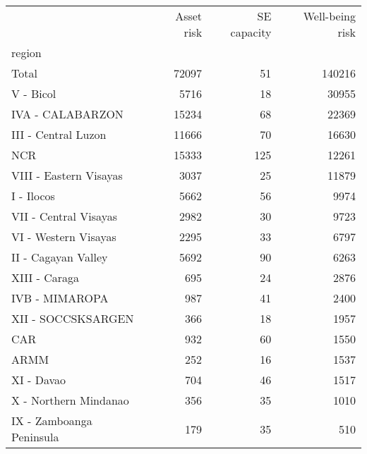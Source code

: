 \begin{tabular}{lrrr}
\toprule
{} &  Asset risk &  SE capacity &  Well-being risk \\
region                   &             &              &                  \\
\midrule
Total                    &       72097 &           51 &           140216 \\
V - Bicol                &        5716 &           18 &            30955 \\
IVA - CALABARZON         &       15234 &           68 &            22369 \\
III - Central Luzon      &       11666 &           70 &            16630 \\
NCR                      &       15333 &          125 &            12261 \\
VIII - Eastern Visayas   &        3037 &           25 &            11879 \\
I - Ilocos               &        5662 &           56 &             9974 \\
VII - Central Visayas    &        2982 &           30 &             9723 \\
VI - Western Visayas     &        2295 &           33 &             6797 \\
II - Cagayan Valley      &        5692 &           90 &             6263 \\
XIII - Caraga            &         695 &           24 &             2876 \\
IVB - MIMAROPA           &         987 &           41 &             2400 \\
XII - SOCCSKSARGEN       &         366 &           18 &             1957 \\
CAR                      &         932 &           60 &             1550 \\
ARMM                     &         252 &           16 &             1537 \\
XI - Davao               &         704 &           46 &             1517 \\
X - Northern Mindanao    &         356 &           35 &             1010 \\
IX - Zamboanga Peninsula &         179 &           35 &              510 \\
\bottomrule
\end{tabular}
